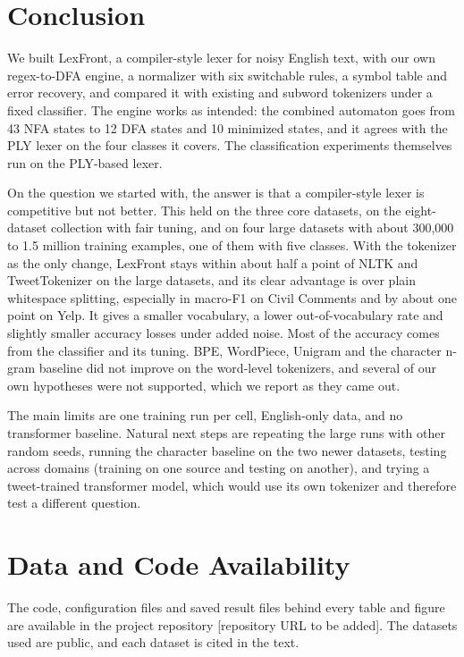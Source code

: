 \documentclass{ieeeaccess}
\begin{document}
\section{Conclusion}\label{sec:6}
We built LexFront, a compiler-style lexer for noisy English text, with our own regex-to-DFA engine, a normalizer with six switchable rules, a symbol table and error recovery, and compared it with existing and subword tokenizers under a fixed classifier. The engine works as intended: the combined automaton goes from 43 NFA states to 12 DFA states and 10 minimized states, and it agrees with the PLY lexer on the four classes it covers. The classification experiments themselves run on the PLY-based lexer.

On the question we started with, the answer is that a compiler-style lexer is competitive but not better. This held on the three core datasets, on the eight-dataset collection with fair tuning, and on four large datasets with about 300,000 to 1.5 million training examples, one of them with five classes. With the tokenizer as the only change, LexFront stays within about half a point of NLTK and TweetTokenizer on the large datasets, and its clear advantage is over plain whitespace splitting, especially in macro-F1 on Civil Comments and by about one point on Yelp. It gives a smaller vocabulary, a lower out-of-vocabulary rate and slightly smaller accuracy losses under added noise. Most of the accuracy comes from the classifier and its tuning. BPE, WordPiece, Unigram and the character n-gram baseline did not improve on the word-level tokenizers, and several of our own hypotheses were not supported, which we report as they came out.

The main limits are one training run per cell, English-only data, and no transformer baseline. Natural next steps are repeating the large runs with other random seeds, running the character baseline on the two newer datasets, testing across domains (training on one source and testing on another), and trying a tweet-trained transformer model, which would use its own tokenizer and therefore test a different question.


\section*{Data and Code Availability}
The code, configuration files and saved result files behind every table and figure are available in the project repository [repository URL to be added]. The datasets used are public, and each dataset is cited in the text.
\end{document}
